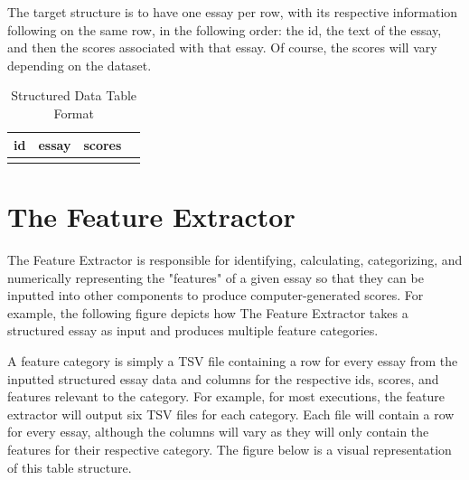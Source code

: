 The target structure is to have one essay per row, with its respective information following on the same row, in the following order: the id, the text of the essay, and then the scores associated with that essay. Of course, the scores will vary depending on the dataset. 

\begin{table}[h]
\centering
\begin{tabular}{@{}|l|l|lllll|@{}}
\toprule
id & essay & \multicolumn{5}{l|}{scores}                                                                      \\ \midrule
   &       & \multicolumn{1}{l|}{} & \multicolumn{1}{l|}{} & \multicolumn{1}{l|}{} & \multicolumn{1}{l|}{} &  \\ \bottomrule
\end{tabular}
\caption{Structured Data Table Format}
\label{tab:2}
\end{table}

\section{The Feature Extractor}

The Feature Extractor is responsible for identifying, calculating, categorizing, and numerically representing the "features" of a given essay so that they can be inputted into other components to produce computer-generated scores. For example, the following figure depicts how The Feature Extractor takes a structured essay as input and produces multiple feature categories.  


A feature category is simply a TSV file containing a row for every essay from the inputted structured essay data and columns for the respective ids, scores, and features relevant to the category. For example, for most executions, the feature extractor will output six TSV files for each category. Each file will contain a row for every essay, although the columns will vary as they will only contain the features for their respective category. The figure below is a visual representation of this table structure. 

